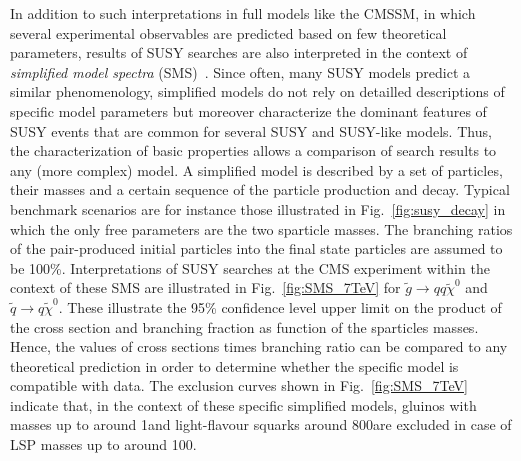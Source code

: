 In addition to such interpretations in full models like the CMSSM, in which several experimental observables are predicted based on few theoretical parameters, results of SUSY searches are also interpreted in the context of \textit{simplified model spectra} (SMS)~\cite{ArkaniHamed:2007fw, Alwall:2008ag, Alwall:2008va, Chatrchyan:2013sza}. Since often, many SUSY models predict a similar phenomenology, simplified models do not rely on detailled descriptions of specific model parameters but moreover characterize the dominant features of SUSY events that are common for several SUSY and SUSY-like models. Thus, the characterization of basic properties allows a comparison of search results to any (more complex) model. A simplified model is described by a set of particles, their masses and a certain sequence of the particle production and decay. Typical benchmark scenarios are for instance those illustrated in Fig.~\ref{fig:susy_decay} in which the only free parameters are the two sparticle masses. The branching ratios of the pair-produced initial particles into the final state particles are assumed to be 100\%. Interpretations of SUSY searches at the CMS experiment within the context of these SMS are illustrated in Fig.~\ref{fig:SMS_7TeV} for $\tilde{g} \rightarrow qq\tilde{\chi}^0$ and $\tilde{q} \rightarrow q \tilde{\chi}^0$. These illustrate the 95\% confidence level upper limit on the product of the cross section and branching fraction as function of the sparticles masses. Hence, the values of cross sections times branching ratio can be compared to any theoretical prediction in order to determine whether the specific model is compatible with data. The exclusion curves shown in Fig.~\ref{fig:SMS_7TeV} indicate that, in the context of these specific simplified models, gluinos with masses up to around 1\tev and light-flavour squarks around 800\gev are excluded in case of LSP masses up to around 100\gev. \\
